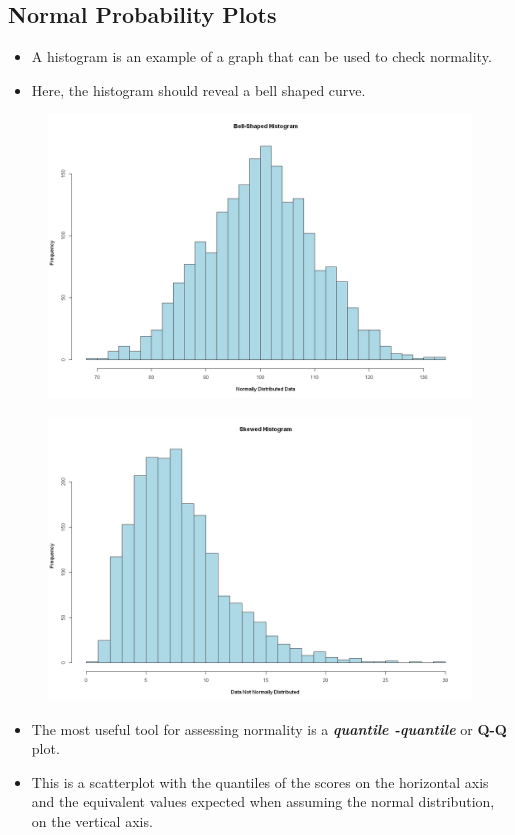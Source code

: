 \documentclass[]{report}
\begin{document}

\subsection{Normal Probability Plots}

\begin{itemize}
\item A histogram is an example of a graph that can be used to check normality. \item Here, the histogram should reveal a bell shaped curve. 
\end{itemize}
\begin{figure}
\centering
\includegraphics[width=0.7\linewidth]{images/LargeXNormHist}
\caption{}
\label{fig:largexnormhist}
\end{figure}



\begin{figure}
\centering
\includegraphics[width=0.7\linewidth]{images/LargeXNotNormHist}
\label{fig:LargeXNotNormHist}
\end{figure}


\begin{itemize}

\item The most useful tool for assessing normality is a \textit{\textbf{quantile -quantile}} or \textbf{Q-Q} plot. \item This is a scatterplot with the quantiles of the scores on the horizontal axis and the equivalent values expected when assuming the normal distribution, on the vertical axis. 
\end{itemize}
\end{document}
